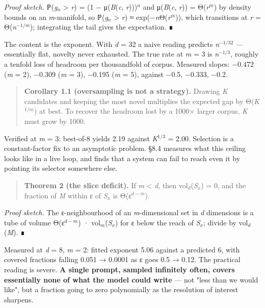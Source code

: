 \documentclass[
  10pt,
]{article}
\theoremstyle{plain}
\theoremstyle{definition}
\begin{document}
\emph{Proof sketch.} ℙ(\emph{g\(_{n}\)} \textgreater{} \emph{r}) = (1 −
μ(\emph{B}(\emph{c}, \emph{r})))\(^{n}\) and μ(\emph{B}(\emph{c},
\emph{r})) = Θ(\emph{r}\(^{m}\)) by density bounds on an
\emph{m}-manifold, so ℙ(\emph{g\(_{n}\)} \textgreater{} \emph{r}) ≈
exp(−\emph{n}Θ(\emph{r\(^{m}\)})), which transitions at \emph{r} =
Θ(\emph{n}\(^{-1/m}\)); integrating the tail gives the expectation. ∎

The content is the exponent. With \emph{d} = 32 a naive reading predicts
\emph{n}\(^{-1/32}\) --- essentially flat, novelty never exhausted. The
true rate at \emph{m} = 3 is \emph{n}\(^{-1/3}\), roughly a tenfold loss
of headroom per thousandfold of corpus. Measured slopes: −0.472
(\emph{m} = 2), −0.309 (\emph{m} = 3), −0.195 (\emph{m} = 5), against
−0.5, −0.333, −0.2.

\begin{quote}
\textbf{Corollary 1.1 (oversampling is not a strategy).} Drawing
\emph{K} candidates and keeping the most novel multiplies the expected
gap by Θ(\emph{K}\(^{1/m}\)) at best. To recover the headroom lost by a
1000× larger corpus, \emph{K} must grow by 1000.
\end{quote}

Verified at \emph{m} = 3: best-of-8 yields 2.19 against
\emph{K}\(^{1/3}\) = 2.00. Selection is a constant-factor fix to an
asymptotic problem. §8.4 measures what this ceiling looks like in a live
loop, and finds that a system can fail to reach even it by pointing its
selector somewhere else.

\begin{quote}
\textbf{Theorem 2 (the slice deficit).} If \emph{m} \textless{}
\emph{d}, then vol\(_{d}\)(\emph{S\(_{x}\)}) = 0, and the fraction of
\emph{M} within ε of \emph{S\(_{x}\)} is Θ(ε\(^{d-m}\)).
\end{quote}

\emph{Proof sketch.} The ε-neighbourhood of an \emph{m}-dimensional set
in \emph{d} dimensions is a tube of volume Θ(ε\(^{d-m}\)) ·
vol\(_{m}\)(\emph{S\(_{x}\)}) for ε below the reach of \emph{S\(_{x}\)};
divide by vol\(_{d}\)(\emph{M}). ∎

Measured at \emph{d} = 8, \emph{m} = 2: fitted exponent 5.06 against a
predicted 6, with covered fractions falling 0.051 → 0.0001 as ε goes 0.5
→ 0.12. The practical reading is severe. \textbf{A single prompt,
sampled infinitely often, covers essentially none of what the model
could write} --- not "less than we would like", but a fraction going to
zero polynomially as the resolution of interest sharpens.
\end{document}
